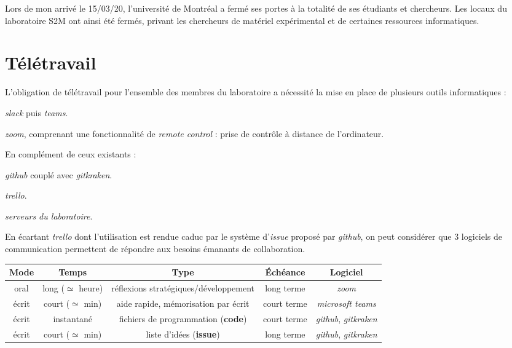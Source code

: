         
Lors de mon arrivé le 15/03/20, l'université de Montréal a fermé ses portes à la totalité de ses étudiants et chercheurs. Les locaux du laboratoire S2M ont ainsi été fermés, privant les chercheurs de matériel expérimental et de certaines ressources informatiques.

        \section{Télétravail}

L'obligation de télétravail pour l’ensemble des membres du laboratoire a nécessité la mise en place de plusieurs outils informatiques :
\label{outils}
\begin{description}
\setlength\itemsep{-0.5em}
\item[Messagerie :] \emph{\gls{slack}} puis \emph{\gls{teams}}.
\item[Visioconférence :] \emph{\gls{zoom}}, comprenant une fonctionnalité de \emph{remote control} : prise de contrôle à distance de l'ordinateur.
\end{description}

En complément de ceux existants :

\begin{description}
\setlength\itemsep{-0.5em}
\item[Gestion de développement de logiciels :] \emph{\gls{github}} couplé avec \emph{\gls{gitkraken}}.
\item[Répartition de taches :] \emph{trello}.
\item[Partage de fichiers :] \emph{serveurs du laboratoire}.
\end{description}

En écartant \emph{trello} dont l'utilisation est rendue caduc par le système d'\emph{issue} proposé par \emph{github}, on peut considérer que 3 logiciels de communication permettent de répondre aux besoins émanants de collaboration.

\begin{table}[h]
\begin{center}
\begin{tabular}{|c|c|c|c|c|}
\hline
Mode & Temps & Type & \'Echéance & Logiciel\\
\hline
oral & long ($\simeq$ heure) & réflexions stratégiques/développement & long terme & \emph{zoom} \\
\hline
écrit & court ($\simeq$ min) & aide rapide, mémorisation par écrit  & court terme & \emph{microsoft teams} \\
\hline
écrit  &  instantané & fichiers de programmation (\textbf{code}) & court terme & \emph{github}, \emph{gitkraken} \\
\hline
écrit  &  court ($\simeq$ min) & liste d'idées (\textbf{issue}) & long terme & \emph{github}, \emph{gitkraken} \\
\hline
\end{tabular}
\end{center}
\end{table}

